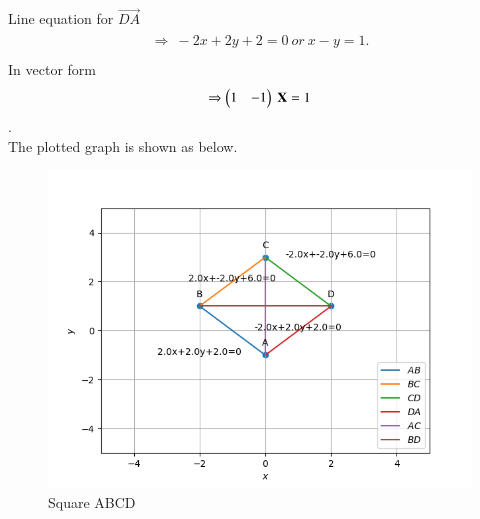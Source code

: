 \documentclass[journal,12pt,twocolumn]{IEEEtran}
\begin{document}
Line equation for $\vec{DA}$
\begin{align}
\begin{split}
\Rightarrow\ -2x+2y+2=0 \ or \ x-y=1. \\
\end{split}
\end{align}
In vector form
\begin{align}
\begin{split}
\Rightarrow \begin{pmatrix}1&-1\end{pmatrix}\ \mathbf{X}=1
\end{split}
\end{align}.
\\
The plotted graph is shown as below.
\begin{figure}[!ht]
    \centering
    \includegraphics[width=\columnwidth]{assignment2.png}
    \caption{Square ABCD}
    \label{fig:Square ABCD}
\end{figure}
\end{document}
